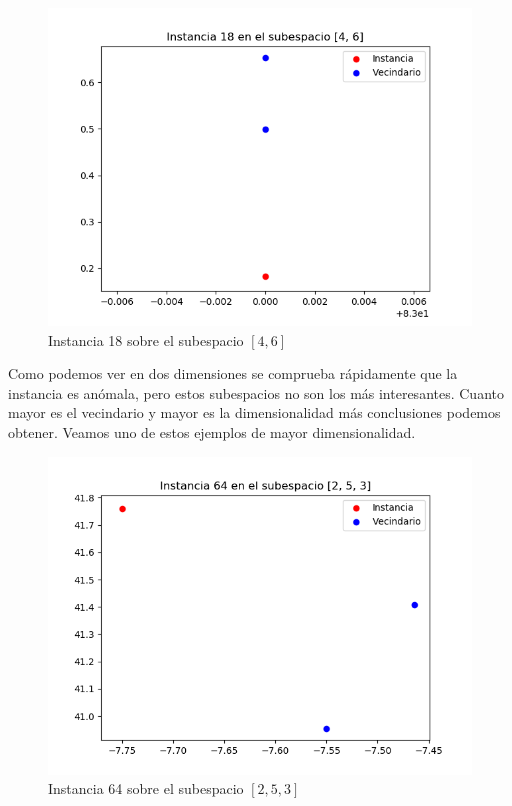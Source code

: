 \begin{figure}[H]
	\centering
	\includegraphics[scale=0.7]{imagenes/22}
	\caption{Instancia 18 sobre el subespacio $[4,6]$}
	\label{22}
\end{figure}

Como podemos ver en dos dimensiones se comprueba rápidamente que la instancia es anómala, pero estos subespacios no son los más interesantes. Cuanto mayor es el vecindario y mayor es la dimensionalidad más conclusiones podemos obtener. Veamos uno de estos ejemplos de mayor dimensionalidad.

\begin{figure}[H]
	\centering
	\includegraphics[scale=0.7]{imagenes/68_tsne}
	\caption{Instancia 64 sobre el subespacio $[2,5,3]$}
	\label{68_tsne}
\end{figure}

